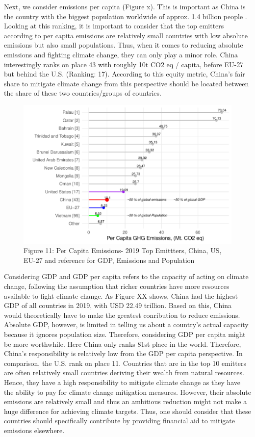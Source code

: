 \documentclass[
  12pt,
]{article}
\numberwithin{equation}{section}
\numberwithin{table}{section}
\numberwithin{figure}{section}
\begin{document}
Next, we consider emissions per capita (Figure x). This is important as
China is the country with the biggest population worldwide of approx.
1.4 billion people \citep{WorldBank2022c}. Looking at this ranking, it
is important to consider that the top emitters according to per capita
emissions are relatively small countries with low absolute emissions but
also small populations. Thus, when it comes to reducing absolute
emissions and fighting climate change, they can only play a minor role.
China interestingly ranks on place 43 with roughly 10t CO2 eq / capita,
before EU-27 but behind the U.S. (Ranking: 17). According to this equity
metric, China's fair share to mitigate climate change from this
perspective should be located between the share of these two
countries/groups of countries.

\begin{figure}
\centering
\includegraphics{Paper_files/figure-latex/unnamed-chunk-14-1.pdf}
\caption{Figure 11: Per Capita Emissions- 2019 \textbar{} Top Emittters,
China, US, EU-27 and reference for GDP, Emissions and Population}
\end{figure}

Considering GDP and GDP per capita refers to the capacity of acting on
climate change, following the assumption that richer countries have more
resources available to fight climate change. As Figure XX shows, China
had the highest GDP of all countries in 2019, with USD 22.49 trillion.
Based on this, China would theoretically have to make the greatest
conribution to reduce emissions. Absolute GDP, however, is limited in
telling us about a country's actual capacity because it ignores
population size. Therefore, considering GDP per capita might be more
worthwhile. Here China only ranks 81st place in the world. Therefore,
China's responsibility is relatively low from the GDP per capita
perspective. In comparison, the U.S. rank on place 11. Countries that
are in the top 10 emitters are often relatively small countries deriving
their wealth from natural resources. Hence, they have a high
responsibility to mitigate climate change as they have the ability to
pay for climate change mitigation measures. However, their absolute
emissions are relatively small and thus an ambitious reduction might not
make a huge difference for achieving climate targets. Thus, one should
consider that these countries should specifically contribute by
providing financial aid to mitigate emissions elsewhere.
\end{document}
